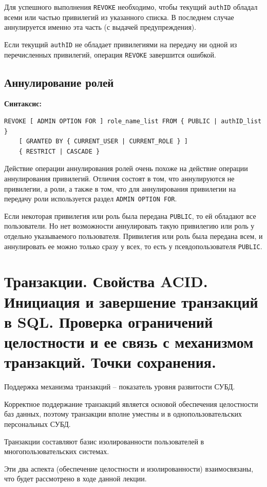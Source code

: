 \documentclass[a4paper,12pt]{article}
\begin{document}
Для успешного выполнения \texttt{REVOKE} необходимо, чтобы текущий \texttt{authID} обладал всеми или частью привилегий из указанного списка. В последнем случае аннулируется именно эта часть (с выдачей предупреждения).

Если текущий \texttt{authID} не обладает привилегиями на передачу ни одной из перечисленных привилегий, операция \texttt{REVOKE} завершится ошибкой.

\subsection{Аннулирование ролей}

\textbf{Синтаксис:}
\begin{verbatim}
REVOKE [ ADMIN OPTION FOR ] role_name_list FROM { PUBLIC | authID_list }
    [ GRANTED BY { CURRENT_USER | CURRENT_ROLE } ]
    { RESTRICT | CASCADE }
\end{verbatim}

Действие операции аннулирования ролей очень похоже на действие операции аннулирования привилегий. Отличия состоят в том, что аннулируются не привилегии, а роли, а также в том, что для аннулирования привилегии на передачу роли используется раздел \texttt{ADMIN OPTION FOR}.

Если некоторая привилегия или роль была передана \texttt{PUBLIC}, то ей обладают все пользователи. Но нет возможности аннулировать такую привилегию или роль у отдельно указываемого пользователя. Привилегия или роль была передана всем, и аннулировать ее можно только сразу у всех, то есть у псевдопользователя \texttt{PUBLIC}.

\section{Транзакции. Свойства ACID. Инициация и завершение транзакций в SQL. Проверка ограничений целостности и ее связь с механизмом транзакций. Точки сохранения.}

Поддержка механизма транзакций – показатель уровня развитости СУБД.

Корректное поддержание транзакций является основой обеспечения целостности баз данных, поэтому транзакции вполне уместны и в однопользовательских персональных СУБД.

Транзакции составляют базис изолированности пользователей в многопользовательских системах.

Эти два аспекта (обеспечение целостности и изолированности) взаимосвязаны, что будет рассмотрено в ходе данной лекции.
\end{document}

